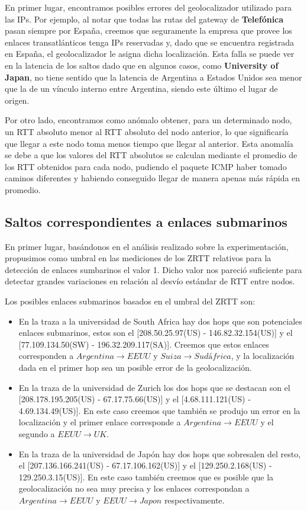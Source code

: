 \documentclass[10pt, a4paper]{article}
\begin{document}
En primer lugar, encontramos posibles errores del geolocalizador utilizado para las IPs. Por ejemplo, al notar que todas las rutas del gateway de \textbf{Telefónica} pasan siempre por España, creemos que seguramente la empresa que provee los enlaces transatlánticos tenga IPs reservadas y, dado que se encuentra registrada en España, el geolocalizador le asigna dicha localización. Esta falla se puede ver en la latencia de los saltos dado que en algunos casos, como \textbf{University of Japan}, no tiene sentido que la latencia de Argentina a Estados Unidos sea menor que la de un vínculo interno entre Argentina, siendo este último el lugar de origen.

Por otro lado, encontramos como anómalo obtener, para un determinado nodo, un RTT absoluto menor al RTT absoluto del nodo anterior, lo que significaría que llegar a este nodo toma menos tiempo que llegar al anterior. Esta anomalía se debe a que los valores del RTT absolutos se calculan mediante el promedio de los RTT obtenidos para cada nodo, pudiendo el paquete ICMP haber tomado caminos diferentes y habiendo conseguido llegar de manera apenas más rápida en promedio.

\subsection{Saltos correspondientes a enlaces submarinos}

En primer lugar, basándonos en el análisis realizado sobre la experimentación, propusimos como umbral en las mediciones de los ZRTT relativos para la detección de enlaces sumbarinos el valor 1. Dicho valor nos pareció suficiente para detectar grandes variaciones en relación al desvío estándar de RTT entre nodos.

Los posibles enlaces submarinos basados en el umbral del ZRTT son:
\begin{itemize}
\item En la traza a la universidad de South Africa hay dos hops que son potenciales enlaces submarinos, estos son el [208.50.25.97(US) - 146.82.32.154(US)] y el [77.109.134.50(SW) - 196.32.209.117(SA)]. Creemos que estos enlaces corresponden a $Argentina \rightarrow EEUU$ y $Suiza \rightarrow Sudáfrica$, y la localización dada en el primer hop sea un posible error de la geolocalización.

\item En la traza de la universidad de Zurich los dos hops que se destacan son el [208.178.195.205(US) - 67.17.75.66(US)] y el [4.68.111.121(US) - 4.69.134.49(US)]. En este caso creemos que también se produjo un error en la localización y el primer enlace corresponde a $Argentina \rightarrow EEUU$  y el segundo a $EEUU \rightarrow UK$.

\item En la traza de la universidad de Japón hay dos hops que sobresalen del resto, el [207.136.166.241(US) - 67.17.106.162(US)] y el [129.250.2.168(US) - 129.250.3.15(US)]. En este caso también creemos que es posible que la geolocalización no sea muy precisa y los enlaces correspondan a $Argentina \rightarrow EEUU$ y $EEUU \rightarrow Japon$ respectivamente.
\end{itemize}
\end{document}
